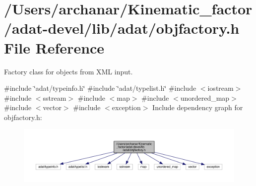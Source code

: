 \hypertarget{adat-devel_2lib_2adat_2objfactory_8h}{}\section{/\+Users/archanar/\+Kinematic\+\_\+factor/adat-\/devel/lib/adat/objfactory.h File Reference}
\label{adat-devel_2lib_2adat_2objfactory_8h}


Factory class for objects from X\+ML input.  


{\ttfamily \#include \char`\"{}adat/typeinfo.\+h\char`\"{}}\newline
{\ttfamily \#include \char`\"{}adat/typelist.\+h\char`\"{}}\newline
{\ttfamily \#include $<$iostream$>$}\newline
{\ttfamily \#include $<$sstream$>$}\newline
{\ttfamily \#include $<$map$>$}\newline
{\ttfamily \#include $<$unordered\+\_\+map$>$}\newline
{\ttfamily \#include $<$vector$>$}\newline
{\ttfamily \#include $<$exception$>$}\newline
Include dependency graph for objfactory.\+h\+:
\nopagebreak
\begin{figure}[H]
\begin{center}
\leavevmode
\includegraphics[width=350pt]{dc/d54/adat-devel_2lib_2adat_2objfactory_8h__incl}
\end{center}
\end{figure}
